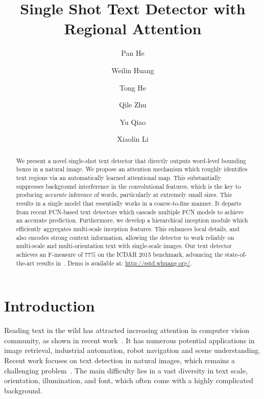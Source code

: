 \documentclass[10pt,twocolumn,letterpaper]{article}
\begin{document}
\title{Single Shot Text Detector with Regional Attention}

\author[1]{Pan He}
\author[2, 3]{Weilin Huang}
\author[3]{Tong He}
\author[1]{Qile Zhu}
\author[3]{Yu Qiao}
\author[1]{Xiaolin Li}

\maketitle
\thispagestyle{empty}


\begin{abstract}
We present a novel single-shot text detector that directly outputs word-level bounding boxes in a natural image. We propose an attention mechanism which roughly identifies text regions via an automatically learned attentional map.  This substantially suppresses background interference in the convolutional features, which is the key to producing \textit{accurate} inference of words, particularly at extremely small sizes. This results in a single model that essentially works in a coarse-to-fine manner. It departs from recent FCN-based text detectors which cascade multiple FCN models to achieve an accurate prediction. Furthermore, we develop a hierarchical inception module which efficiently aggregates multi-scale inception features. This enhances local details, and also encodes strong context information,  allowing the detector to work reliably on multi-scale and multi-orientation text with single-scale images.
Our text detector achieves an F-measure of 77\% on the ICDAR 2015 benchmark, advancing the state-of-the-art results in~\cite{Liu2017, Tian2016}. Demo is available at: \url{http://sstd.whuang.org/}.
\end{abstract}
\section{Introduction}

Reading text in the wild has attracted increasing attention in computer vision community, as shown in recent work~\cite{Tian2016, Gupta2016, Zhang2016, Zhu2016, Cho2016, Pan2016_reading}. It has numerous potential applications in image retrieval, industrial automation, robot navigation and scene understanding. Recent work focuses on text detection in natural images, which remains a challenging problem~\cite{Tian2016, Gupta2016, Zhang2016, Zhu2016, Cho2016}. The main difficulty lies in a vast diversity in text scale, orientation, illumination, and font, which often come with a highly complicated background.
\end{document}
